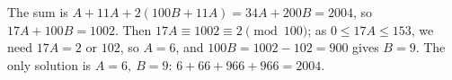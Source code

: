 The sum is $A+11A+2(100B+11A)=34A+200B=2004$, so $17A+100B=1002$. Then $17A\equiv1002\equiv2\pmod{100}$; as $0\le17A\le153$, we need $17A=2$ or $102$, so $A=6$, and $100B=1002-102=900$ gives $B=9$. The only solution is $\boxed{A=6,\ B=9}$: $6+66+966+966=2004$.
